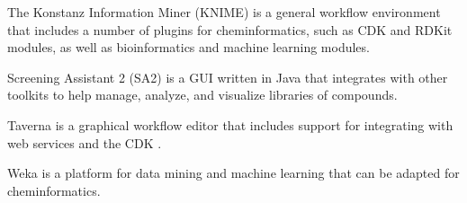 The Konstanz Information Miner (KNIME) is a general workflow environment that includes a number of plugins for cheminformatics, such as CDK \cite{Beisken_2013} and RDKit modules, as well as bioinformatics and machine learning modules.

Screening Assistant 2 (SA2) \cite{Guilloux_2012} is a GUI written in Java that integrates with other toolkits to help manage, analyze, and visualize libraries of compounds.

Taverna \cite{Wolstencroft_2013} is a graphical workflow editor that includes support for integrating with web services and the CDK \cite{Kuhn_2010}.

Weka \cite{Hall_2009} is a platform for data mining and machine learning that can be adapted for cheminformatics.  
